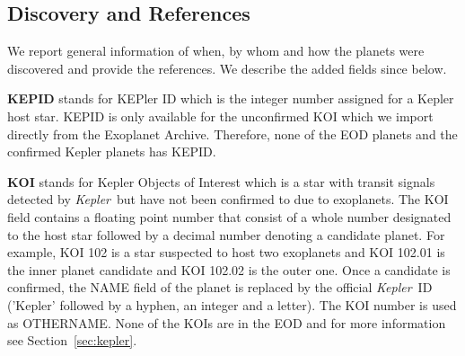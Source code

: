 \documentclass[11pt,preprint]{aastex}
\def\kepler{\textit{Kepler}}
\begin{document}
\begin{CJK*}{UTF8}{gbsn}
\subsection{Discovery and References}

We report general information of when, by whom and how the planets were
discovered and provide the references. We describe the added fields since \cite{Wright2011} below.

{\bf KEPID} stands for KEPler ID which is the integer number assigned for a Kepler host star. KEPID is only available for the unconfirmed KOI which we import directly from the Exoplanet Archive. Therefore, none of the EOD planets and the confirmed Kepler planets has KEPID.


{\bf KOI} stands for Kepler Objects of Interest which is a star with transit signals detected by \kepler\ but have not been confirmed to due to exoplanets. The KOI field contains a floating point number that consist of a whole number designated to the host star followed by a decimal number denoting a candidate planet. For example, KOI 102 is a star suspected to host two exoplanets and KOI 102.01 is the inner planet candidate and KOI 102.02 is the outer one. Once a candidate is confirmed, the NAME field of the planet is replaced by the official \kepler\ ID ('Kepler' followed by a hyphen, an integer and a letter). The KOI number is used as OTHERNAME. None of the KOIs are in the EOD and for more information see Section~\ref{sec:kepler}. 

\begin{comment}
\textit {Sharon: you need to say what KOI stores. When writing each
  field, keep in mind you need to cover the following so that the
  reader will completely understand: (1) what the field stands for
  (e.g., in case of an abbreviation like KOI); (2) what the field
  physically means, like `KOI' means planet candidates that have transit
  signals as detected by \kepler\ but have not been confirmed, and
  make sure to be thorough at what you say -- sometimes things are not
  that obvious to an outsider reader, e.g., think if a cosmologist
  would understand what you're saying when reading it; (3) what the
  field actually contains, e.g. KOI contains the KOI number designated
  by the \kepler\ team (right?), it is a floating point number, and
  sometimes maybe even worth giving an example, e.g. KOI 30.1 or
  something...; (4) why we added this new field, if this information
  is helpful, or if it's a revised field since \cite{Wright2011}, what
  is changed. Also, use \kepler\ (which is a defined symbol in our ms.tex file),
  instead of typing out Kepler, since you need italic.
  Don't be afraid to write more! Being concise is important, but it's
  always easier to trim down things than to add things on, especially
  for a documentation type of paper like this. Let's be thorough at
  first, then try to reach optimal conciseness.}
 \end{comment}


\end{CJK*}
\end{document}
